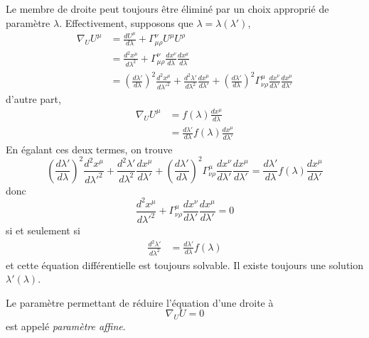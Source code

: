 \documentclass[a4paper,11pt]{report}
\begin{document}
            Le membre de droite peut toujours être éliminé par un choix approprié de paramètre $\lambda$. Effectivement, supposons que $\lambda = \lambda(\lambda')$,
            \begin{align}
                \nabla_U U^\mu &= \frac{dU^\mu}{d\lambda} + \Gamma^\nu_{\mu\rho} U^\mu U^\rho \\
                &= \frac{d^2x^\mu}{d\lambda^2} + \Gamma^\nu_{\mu\rho} \frac{dx^\nu}{d\lambda}\frac{dx^\mu}{d\lambda} \\
                &= \left( \frac{d\lambda'}{d\lambda} \right)^2\frac{d^2x^\mu}{d\lambda'^2}+\frac{d^2\lambda'}{d\lambda^2}\frac{dx^\mu}{d\lambda'}+\left( \frac{d\lambda'}{d\lambda} \right)^2\Gamma^\mu_{\nu\rho} \frac{dx^\nu}{d\lambda'}\frac{dx^\mu}{d\lambda'}
            \end{align}
            d'autre part, 
            \begin{align}
                \nabla_U U^\mu &= f(\lambda) \frac{dx^\mu}{d\lambda} \\
                &= \frac{d\lambda'}{d\lambda}f(\lambda)\frac{dx^\mu}{d\lambda'}
            \end{align}
            En égalant ces deux termes, on trouve
            \begin{equation}
                \left( \frac{d\lambda'}{d\lambda} \right)^2\frac{d^2x^\mu}{d\lambda'^2}+\frac{d^2\lambda'}{d\lambda^2}\frac{dx^\mu}{d\lambda'}+\left( \frac{d\lambda'}{d\lambda} \right)^2\Gamma^\mu_{\nu\rho} \frac{dx^\nu}{d\lambda'}\frac{dx^\mu}{d\lambda'} = \frac{d\lambda'}{d\lambda}f(\lambda)\frac{dx^\mu}{d\lambda'}
            \end{equation}
            donc
            \begin{equation}
                \frac{d^2x^\mu}{d\lambda'^2} + \Gamma^\mu_{\nu\rho} \frac{dx^\nu}{d\lambda'}\frac{dx^\mu}{d\lambda'} = 0
            \end{equation}
            si et seulement si
            \begin{align}
                \frac{d^2\lambda'}{d\lambda^2} &= \frac{d\lambda'}{d\lambda}f(\lambda)
            \end{align}
            et cette équation différentielle est toujours solvable. Il existe toujours une solution $\lambda'(\lambda)$.
            
            \begin{definition}
                Le paramètre permettant de réduire l'équation d'une droite à 
                \begin{equation}
                    \nabla_U U = 0
                \end{equation}
                est appelé \textit{paramètre affine}.
            \end{definition}
            
\end{document}
